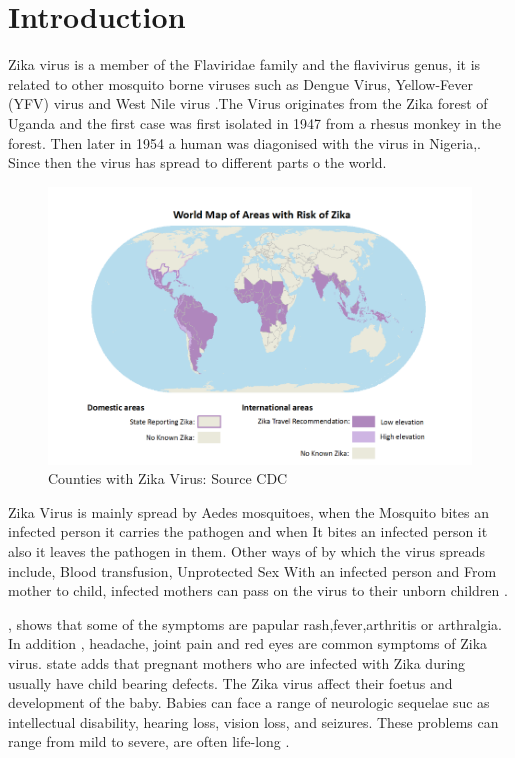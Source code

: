 \chapter{Introduction}

Zika virus is a member of the Flaviridae family
and the flavivirus genus, it is related to other mosquito borne viruses such as Dengue Virus, Yellow-Fever (YFV) virus  and West Nile virus \citep{doi}.The Virus originates from the Zika forest of Uganda and the first case was first isolated in 1947 from a rhesus monkey in the forest. Then later in 1954 a human was diagonised with the virus in Nigeria,\citep{2015zika}. Since then the virus has spread to different parts o the world. 
\begin{figure}[h!]
\centering
\includegraphics[scale=0.5]{images/map_zika.png} 
\caption{Counties with Zika Virus: Source CDC}\label{fig 1}
\end{figure}


Zika Virus is mainly spread by Aedes mosquitoes, when the Mosquito bites an infected person it carries the pathogen and when It bites an infected person it also it leaves the pathogen in them. Other ways of by which the virus spreads include, Blood transfusion, Unprotected Sex With an infected person and From mother to child, infected mothers can pass on the virus to their unborn children \citep{musso2014}.

\cite{musso2015}, shows that some of the symptoms are papular rash,fever,arthritis or arthralgia. In addition , headache, joint pain and red eyes are common symptoms of Zika virus. \cite{simoes2016zika} state adds that pregnant mothers who are infected with Zika during usually have child bearing defects. The Zika virus affect their foetus and development of the baby. Babies can face a range of neurologic sequelae suc as intellectual disability, hearing loss, vision loss, and seizures. These problems can range from mild to severe, are often life-long \citep{rasmussen2016zika}.


